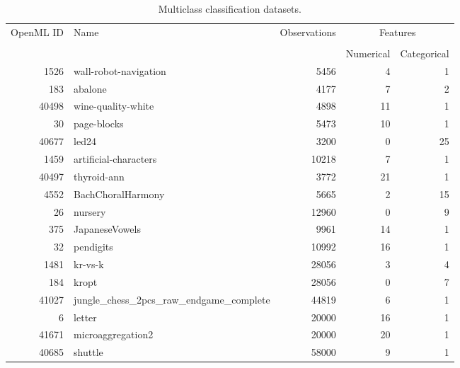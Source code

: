\begin{table}[h!]
\centering
\begin{tabular}{rlrrr}
\toprule
\multirow{2}{*}{OpenML ID} & \multirow{2}{*}{Name} & \multirow{2}{*}{Observations} & \multicolumn{2}{c}{Features} \\ \cline{4-5}
\\[-0.75em]
&                       &                            & Numerical    & Categorical   \\
\midrule
      1526 &                  wall-robot-navigation &         5456 &                4 &                1 \\
       183 &                                abalone &         4177 &                7 &                2 \\
     40498 &                     wine-quality-white &         4898 &               11 &                1 \\
        30 &                            page-blocks &         5473 &               10 &                1 \\
     40677 &                                  led24 &         3200 &                0 &               25 \\
      1459 &                  artificial-characters &        10218 &                7 &                1 \\
     40497 &                            thyroid-ann &         3772 &               21 &                1 \\
      4552 &                      BachChoralHarmony &         5665 &                2 &               15 \\
        26 &                                nursery &        12960 &                0 &                9 \\
       375 &                         JapaneseVowels &         9961 &               14 &                1 \\
        32 &                              pendigits &        10992 &               16 &                1 \\
      1481 &                                kr-vs-k &        28056 &                3 &                4 \\
       184 &                                  kropt &        28056 &                0 &                7 \\
     41027 & jungle\_chess\_2pcs\_raw\_endgame\_complete &        44819 &                6 &                1 \\
         6 &                                 letter &        20000 &               16 &                1 \\
     41671 &                      microaggregation2 &        20000 &               20 &                1 \\
     40685 &                                shuttle &        58000 &                9 &                1 \\
\bottomrule
\end{tabular}
\caption{Multiclass classification datasets.}
\label{tab:multiclass_data}
\end{table}
